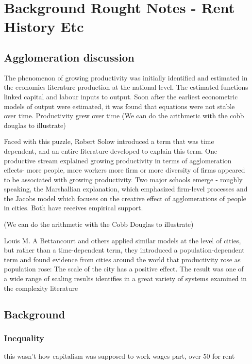 \chapter{Background Rought Notes - Rent History Etc}



\section{Agglomeration discussion}

The phenomenon of growing productivity was initially identified and estimated in the economics literature production at the national level. The estimated functions linked capital and labour inputs to output.  Soon after the  earliest econometric models of output  were estimated, it was found that equations were not stable over time. Productivity grew over time
(We can do the arithmetic with the cobb douglas to illustrate) 

Faced with this puzzle, Robert Solow introduced a term that was time dependent, and an entire literature developed to explain this term. One productive stream explained growing productivity in terms of agglomeration effects- more people, more workers more firm or more diversity of firms appeared to be associated with growing productivity. Two major schools emerge - roughly speaking,  the Marshallian explanation, which emphasized firm-level processes and the Jacobs model which focuses on the creative effect of agglomerations of people in cities. Both have receives empirical support.

(We can do the arithmetic with the Cobb Douglas to illustrate)

Louis M. A Bettancourt and others applied similar models at the level of cities, but rather than a time-dependent term, they introduced a population-dependent term and found evidence from cities around the world that productivity rose as population rose: The scale of the city has a positive effect. The result  was one of a wide range of scaling results identifies in a great variety of systems examined in the complexity literature 


\section{Background}

\subsection{Inequality}
this wasn't how capitalism was supposed to work
wages part, 
over 50 for rent

